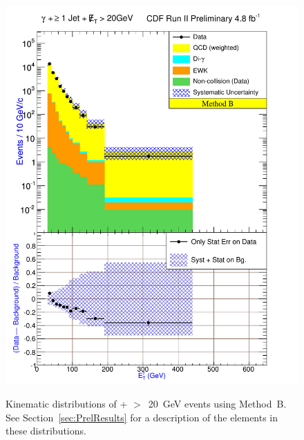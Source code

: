 \documentclass[12pt,twoside,letterpaper,doublespace]{article}
\begin{document}
\begin{figure}[h!]
 \centering
\caption[Method B \phoonejet]{Kinematic distributions of \phoonejet + \met$>$~20~GeV events using \mbox{Method B}. See Section~\ref{sec:PrelResults} for a description of the elements in these distributions.}
{\includegraphics[keepaspectratio=true, scale=\figScale]{G30JetsMet20_MtdB_plot1_Et_pho.pdf}}

\end{figure}
\end{document}
